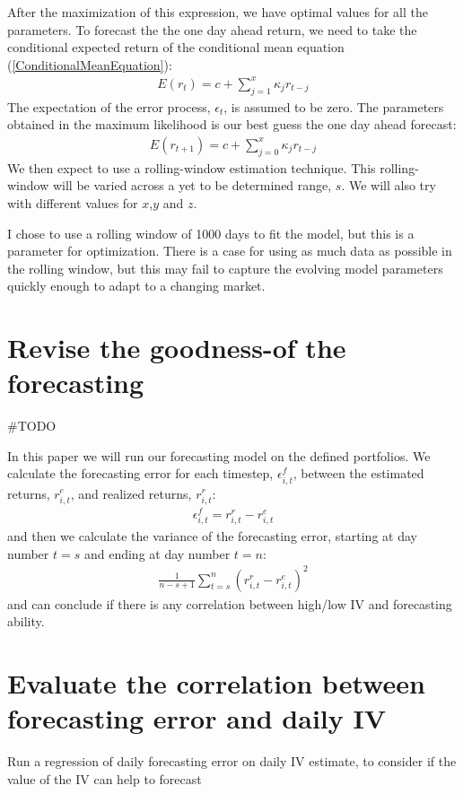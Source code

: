 After the maximization of this expression, we have optimal values for all the parameters. To forecast the the one day ahead return, we need to take the conditional expected return of the conditional mean equation (\ref{ConditionalMeanEquation}):
\begin{align} 
    E(r_{t})=c+\sum_{j=1}^x\kappa_j r_{t-j}
\end{align}
The expectation of the error process, $\epsilon_t$, is assumed to be zero. The parameters obtained in the maximum likelihood is our best guess the one day ahead forecast:
\begin{align} 
    E(r_{t+1})=c+\sum_{j=0}^x\kappa_j r_{t-j}
\end{align}
We then expect to use a rolling-window estimation technique. This rolling-window will be varied across a yet to be determined range, $s$. We will also try with different values for $x$,$y$ and $z$. 

I chose to use a rolling window of 1000 days to fit the model, but this is a parameter for optimization. There is a case for using as much data as possible in the rolling window, but this may fail to capture the evolving model parameters quickly enough to adapt to a changing market.

\section*{Revise the goodness-of the forecasting}

#TODO 



In this paper we will run our forecasting model on the defined portfolios. We calculate the forecasting error for each timestep, $\epsilon_{i,t}^{f}$, between the estimated returns, $r_{i,t}^{e}$, and realized returns, $r_{i,t}^{r}$:
\begin{align}
    \epsilon_{i,t}^{f} = r_{i,t}^{r} - r_{i,t}^{e}
\end{align}
and then we calculate the variance of the forecasting error, starting at day number $t=s$ and ending at day number $t=n$:
\begin{align}
    \frac{1}{n-s+1}\sum_{t=s}^{n}(r_{i,t}^{r} - r_{i,t}^{e})^{2}
\end{align}
and can conclude if there is any correlation between high/low IV and forecasting ability.

\section*{Evaluate the correlation between forecasting error and daily IV} Run a regression of daily forecasting error on daily IV estimate, to consider if the value of the IV can help to forecast
